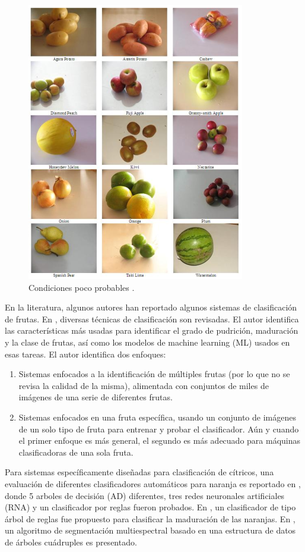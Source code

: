 \documentclass[twoside,spanish,ESP,MSc]{plantillaLabUPV}
\theoremstyle{definition}
\begin{document}
\begin{figure}[!tbh]
	\centering
	\includegraphics*[scale=0.5]{datchafa} 
	\caption{Condiciones poco probables \cite{chafafrut}.}
	\label{chafa}
\end{figure}

En la literatura, algunos autores han reportado algunos sistemas de clasificación de frutas. En  \cite{7306754}, diversas técnicas de clasificación son revisadas. El autor identifica las características más usadas para identificar el grado de pudrición, maduración y la clase de frutas, así como los modelos de machine learning (ML) usados en esas tareas. El autor identifica dos enfoques: 


\begin{enumerate}
	\itemsep 0em
	\item Sistemas enfocados a la identificación de múltiples frutas (por lo que no se revisa la calidad de la misma), alimentada con conjuntos de miles de imágenes de una serie de diferentes frutas. 
	\item Sistemas enfocados en una fruta específica, usando un conjunto de imágenes de un solo tipo de fruta para entrenar y probar el clasificador. Aún y cuando el primer enfoque es más general, el segundo es más adecuado para máquinas clasificadoras de una sola fruta.
\end{enumerate}

Para sistemas específicamente diseñadas para clasificación de cítricos, una evaluación de diferentes clasificadores automáticos para naranja es reportado en \cite{analis}, donde 5 arboles de decisión (AD) diferentes, tres redes neuronales artificiales (RNA) y un clasificador por reglas fueron probados. En \cite{chokun}, un clasificador de tipo árbol de reglas fue propuesto para clasificar la maduración de las naranjas. En \cite{Martinez-Uso:2005:MIS:1565835.1565847}, un algoritmo de segmentación multiespectral basado en una estructura de datos de árboles cuádruples es presentado. 
\end{document}
